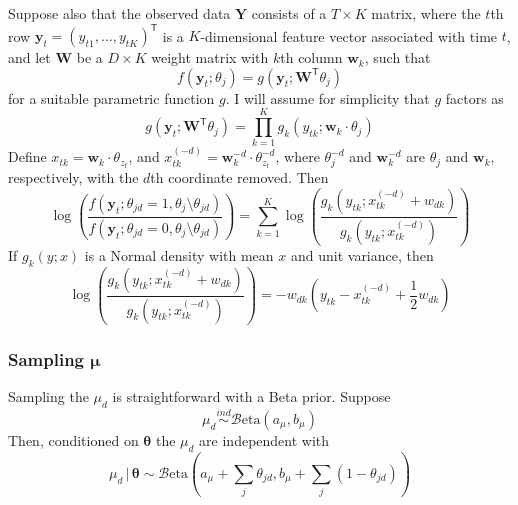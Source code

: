 \documentclass[12pt,letterpaper]{report}
\newcommand{\Beta}[2]{\mathcal{B}\mathrm{eta}(#1,#2)}
\newcommand{\given}{\, \vert \,}
\newcommand{\by}{\mathbf{y}}
\newcommand{\bY}{\mathbf{Y}}
\newcommand{\bw}{\mathbf{w}}
\newcommand{\bW}{\mathbf{W}}
\newcommand{\btheta}{\boldsymbol{\theta}}
\newcommand{\bmu}{\boldsymbol{\mu}}
\begin{document}
Suppose also that the observed data $\bY$ consists of a $T \times K$
matrix, where the $t$th row $\by_t = (y_{t1}, \dots,
y_{tK})^{\mathsf{T}}$ is a $K$-dimensional feature vector associated
with time $t$, and let $\bW$ be a $D \times K$ weight matrix
with $k$th column $\bw_k$, such that 
\begin{equation}
  \label{eq:74}
  f(\by_t; \theta_j) = g(\by_t; \bW^{\mathsf{T}} \theta_j)
\end{equation}
for a suitable parametric function $g$.  I will assume for simplicity
that $g$ factors as
\begin{equation}
  \label{eq:73}
  g(\by_t; \bW^{\mathsf{T}} \theta_j) = \prod_{k=1}^K g_k(y_{tk}; \bw_k \cdot \theta_j)
\end{equation}
Define $x_{tk} = \bw_k \cdot \theta_{z_{t}}$, and
$x_{tk}^{(-d)} = \bw_k^{-d} \cdot \theta_{z_{t}}^{-d}$, where
$\theta_{j}^{-d}$ and $\bw_{k}^{-d}$ are $\theta_{j}$ and $\bw_k$, respectively, with
the $d$th coordinate removed.  Then
\begin{equation}
  \label{eq:76}
  \log\left(\frac{f(\by_t; \theta_{jd} = 1, \theta_j \setminus
    \theta_{jd})}{f(\by_t; \theta_{jd} = 0, \theta_j \setminus \theta_{jd})}\right) =
  \sum_{k=1}^K \log\left(\frac {g_k(y_{tk};
    x_{tk}^{(-d)} + w_{dk})}{g_k(y_{tk};
    x_{tk}^{(-d)})}\right)
\end{equation}
If $g_k(y; x)$ is a Normal density with mean $x$ and unit variance, then
\begin{equation}
  \label{eq:91}
  \log\left(\frac {g_k(y_{tk};
    x_{tk}^{(-d)} + w_{dk})}{g_k(y_{tk};
    x_{tk}^{(-d)})}\right) = -w_{dk}(y_{tk} - x_{tk}^{(-d)} + \frac{1}{2}w_{dk})
\end{equation}

\subsubsection{Sampling $\bmu$}
\label{sec:sampling-bmu}

Sampling the $\mu_d$ is straightforward with a Beta prior.  Suppose
\begin{equation}
  \label{eq:92}
  \mu_d \stackrel{ind}{\sim} \Beta{a_\mu}{b_\mu}
\end{equation}
Then, conditioned on $\btheta$ the $\mu_d$ are independent with
\begin{equation}
  \label{eq:93}
  \mu_d \given \btheta \sim \Beta{a_\mu + \sum_{j} \theta_{jd}}{b_\mu +
  \sum_{j} (1 - \theta_{jd})}
\end{equation}
\end{document}
